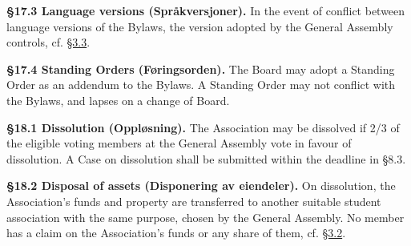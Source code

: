 \documentclass{../../../Common/Latex/Templates/rapport}
\begin{document}
\textbf{\S 17.3 Language versions (Språkversjoner).}\label{bylaw:17.3} In the event of conflict between language versions of the Bylaws, the version adopted by the General Assembly controls, cf. \hyperref[bylaw:3.3]{\S 3.3}.

\textbf{\S 17.4 Standing Orders (Føringsorden).}\label{bylaw:17.4} The Board may adopt a Standing Order as an addendum to the Bylaws. A Standing Order may not conflict with the Bylaws, and lapses on a change of Board.

\label{bylaw:18}
\textbf{\S 18.1 Dissolution (Oppløsning).}\label{bylaw:18.1} The Association may be dissolved if 2/3 of the eligible voting members at the General Assembly vote in favour of dissolution. A Case on dissolution shall be submitted within the deadline in \S8.3.

\textbf{\S 18.2 Disposal of assets (Disponering av eiendeler).}\label{bylaw:18.2} On dissolution, the Association's funds and property are transferred to another suitable student association with the same purpose, chosen by the General Assembly. No member has a claim on the Association's funds or any share of them, cf. \hyperref[bylaw:3.2]{\S 3.2}.
\end{document}
